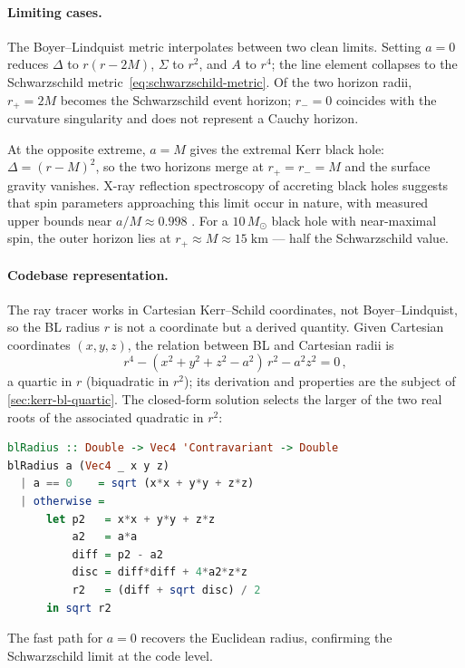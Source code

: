 \paragraph{Limiting cases.}

The Boyer--Lindquist metric interpolates between two clean limits.
Setting $a = 0$ reduces $\Delta$ to $r(r - 2M)$, $\Sigma$ to $r^2$,
and $A$ to $r^4$; the line element collapses to the Schwarzschild
metric~\eqref{eq:schwarzschild-metric}.  Of the two horizon radii,
$r_+ = 2M$ becomes the Schwarzschild event horizon; $r_- = 0$
coincides with the curvature singularity and does not represent a
Cauchy horizon.

At the opposite extreme, $a = M$ gives the extremal Kerr black hole:
$\Delta = (r - M)^2$, so the two horizons merge at $r_+ = r_- = M$
and the surface gravity vanishes.  X-ray reflection spectroscopy of
accreting black holes suggests that spin parameters approaching this
limit occur in nature, with measured upper bounds near
$a/M \approx 0.998$ \cite{Thorne1974}.  For a
$10\,M_\odot$ black hole with near-maximal spin, the outer horizon
lies at $r_+ \approx M \approx 15\;\text{km}$ --- half the
Schwarzschild value.

\paragraph{Codebase representation.}

The ray tracer works in Cartesian Kerr--Schild coordinates, not
Boyer--Lindquist, so the BL radius $r$ is not a coordinate but a
derived quantity.  Given Cartesian coordinates $(x, y, z)$, the
relation between BL and Cartesian radii is
%
\begin{equation}
  r^4 - (x^2 + y^2 + z^2 - a^2)\,r^2 - a^2 z^2 = 0 \,,
  \label{eq:bl-quartic}
\end{equation}
%
a quartic in $r$ (biquadratic in $r^2$); its derivation and
properties are the subject of \cref{sec:kerr-bl-quartic}.  The
closed-form solution selects the larger of the two real roots of the
associated quadratic in $r^2$:
%
\begin{lstlisting}[language=Haskell]
blRadius :: Double -> Vec4 'Contravariant -> Double
blRadius a (Vec4 _ x y z)
  | a == 0    = sqrt (x*x + y*y + z*z)
  | otherwise =
      let p2   = x*x + y*y + z*z
          a2   = a*a
          diff = p2 - a2
          disc = diff*diff + 4*a2*z*z
          r2   = (diff + sqrt disc) / 2
      in sqrt r2
\end{lstlisting}
%
The fast path for $a = 0$ recovers the Euclidean radius, confirming
the Schwarzschild limit at the code level.
